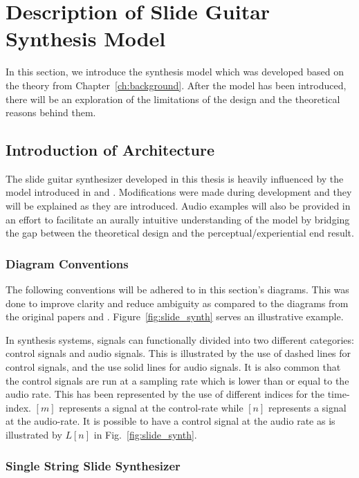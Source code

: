 \documentclass[../main.tex]{subfiles}
\begin{document}
\chapter{Description of Slide Guitar Synthesis Model}
In this section, we introduce the synthesis model which was developed based on the theory from Chapter~\ref{ch:background}. After the model has been introduced, there will be an exploration of the limitations of the design and the theoretical reasons behind them.

\section{Introduction of Architecture}
The slide guitar synthesizer developed in this thesis is heavily influenced by the model introduced in  and . Modifications were made during development and they will be explained as they are introduced. Audio examples will also be provided in an effort to facilitate an aurally intuitive understanding of the model by bridging the gap between the theoretical design and the perceptual/experiential end result.

\subsection{Diagram Conventions}
The following conventions will be adhered to in this section's diagrams. This was done to improve clarity and reduce ambiguity as compared to the diagrams from the original papers  and . Figure~\ref{fig:slide_synth} serves an illustrative example.

In synthesis systems, signals can functionally divided into two different categories: control signals and audio signals. This is illustrated by the use of dashed lines for control signals, and the use solid lines for audio signals. It is also common that the control signals are run at a sampling rate which is lower than or equal to the audio rate. This has been represented by the use of different indices for the time-index. $[m]$ represents a signal at the control-rate while $[n]$ represents a signal at the audio-rate. It is possible to have a control signal at the audio rate as is illustrated by $L[n]$ in Fig.~\ref{fig:slide_synth}.

\subsection{Single String Slide Synthesizer}
\end{document}
